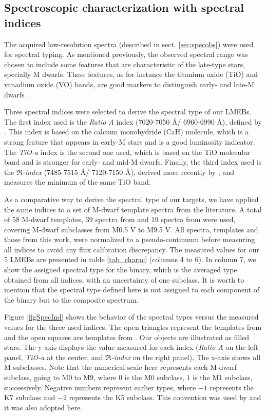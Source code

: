 \documentclass[fleqn,usenatbib]{mnras}
\begin{document}
\subsection{Spectroscopic characterization with spectral indices}

The acquired low-resolution spectra (described in sect. \ref{sec:specobs}) were used for spectral typing. As mentioned previously, the observed spectral range was chosen to include some features that are characteristic of the late-type stars, specially M dwarfs. These features, as for instance the titanium oxide (TiO) and vanadium oxide (VO) bands, are good markers to distinguish early- and late-M dwarfs \citep{Keenan52,Kirkpatrick91}.

Three spectral indices were selected to derive the spectral type of our LMEBs. The first index used is the {\it Ratio A} index (7020-7050 \AA / 6960-6990 \AA), defined by \citet{Kirkpatrick91}. This index is based on the calcium monohydride (CaH) molecule, which is a strong feature that appears in early-M stars and is a good luminosity indicator. 
The {\it TiO-a} index \citep[7033-7048 \AA / 7058-7073 \AA,][]{Kirkpatrick99} is the second one used, which is based on the TiO molecular band and is stronger for early- and mid-M dwarfs. Finally, the third index used is the {\it $\Re$-index} (7485-7515 \AA / 7120-7150 \AA), derived more recently by \citet{Aberasturi14}, and measures the minimum of the same TiO band.

As a comparative way to derive the spectral type of our targets, we have applied the same indices to a set of M-dwarf template spectra from the literature. A total of 58 M-dwarf templates, 39 spectra from \citet{Leggett00} and 19 spectra from \citet{Cruz02} were used, covering M-dwarf subclasses from M0.5 V to M9.5 V. All spectra, templates and those from this work, were normalized to a pseudo-continuum before measuring all indices to avoid any flux calibration discrepancy. The measured values for our 5 LMEBs are presented in table \ref{tab_charac} (columns 4 to 6). In column 7, we show the assigned spectral type for the binary, which is the averaged type obtained from all indices, with an uncertainty of one subclass. It is worth to mention that the spectral type defined here is not assigned to each component of the binary but to the composite spectrum.

Figure \ref{figSpecInd} shows the behavior of the spectral types versus the measured values for the three used indices. The open triangles represent the templates from \citet{Leggett00} and the open squares are templates from \citet{Cruz02}. Our objects are illustrated as filled stars. The y-axis displays the value measured for each index ({\it Ratio A} on the left panel, {\it TiO-a} at the center, and {\it $\Re$-index} on the right panel). The x-axis shows all M subclasses. Note that the numerical scale here represents each M-dwarf subclass, going to M0 to M9, where $0$ is the M0 subclass, $1$ is the M1 subclass, successively. Negative numbers represent earlier types, where $-1$ represents the K7 subclass and $-2$ represents the K5 subclass. This convention was used by \citet[][fig. 6]{Kirkpatrick91} and it was also adopted here.
\end{document}

